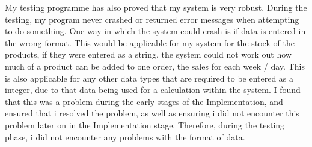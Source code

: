 My testing programme has also proved that my system is very robust. During the testing, my program never crashed or returned error messages when attempting to do something. One way in which the system could crash is if data is entered in the wrong format. This would be applicable for my system for the stock of the products, if they were entered as a string, the system could not work out how much of a product can be added to one order, the sales for each week / day. This is also applicable for any other data types that are required to be entered as a integer, due to that data being used for a calculation within the system. I found that this was a problem during the early stages of the Implementation, and ensured that i resolved the problem, as well as ensuring i did not encounter this problem later on in the Implementation stage. Therefore, during the testing phase, i did not encounter any problems with the format of data.

